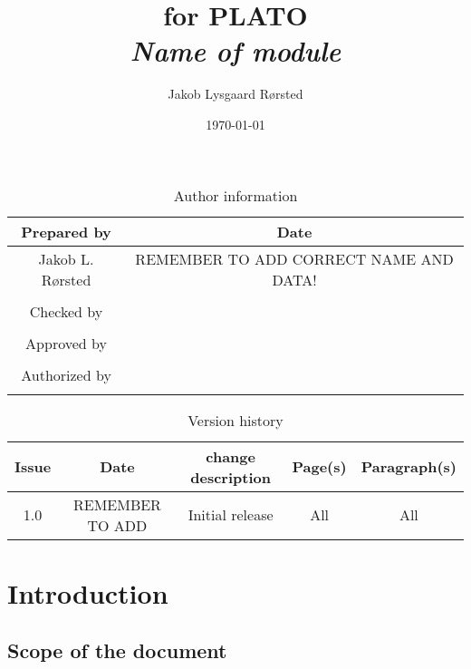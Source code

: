 \documentclass[a4paper, oneside, 11pt, article, english]{memoir}
\author{Jakob Lysgaard Rørsted}
\title{\shorttitle{} for PLATO \\ \Large\textit{Name of module}}
\date{\today}
\begin{document}
\maketitle

\begin{table}[htbp]
  \centering
  \caption{Author information}
  \label{tab:author}
  \begin{tabular}{cc}
    \toprule
    Prepared by & Date\\
    \midrule
    Jakob L. Rørsted & REMEMBER TO ADD CORRECT NAME AND DATA! \\
    \\
    Checked by \\
    \midrule
    \\
    Approved by \\
    \midrule
    \\
    Authorized by \\
    \midrule
    \\
    \bottomrule
  \end{tabular}
\end{table}

\begin{table}[htbp]
  \centering
  \caption{Version history}
  \label{tab:version}
  \begin{tabular}{ccccc}
    \toprule
    Issue & Date & \textnumero{} change description & Page(s) & Paragraph(s) \\
    \midrule
    1.0 & REMEMBER TO ADD & Initial release & All & All \\
    \bottomrule
  \end{tabular}
\end{table}


\clearpage
\tableofcontents*
\clearpage


\chapter{Introduction}
\label{chap:intro}

\section{Scope of the document}
\label{sec:scope}
\end{document}
